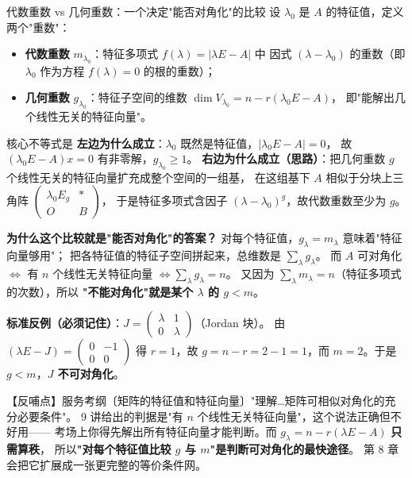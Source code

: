 \begin{fdeep}{代数重数 vs 几何重数：一个决定"能否对角化"的比较}
设 $\lambda_0$ 是 $A$ 的特征值，定义两个"重数"：
\begin{itemize}[leftmargin=2.2em,itemsep=0.22em]
\item \textbf{代数重数} $m_{\lambda_0}$：特征多项式 $f(\lambda)=\lvert\lambda E-A\rvert$ 中
      因式 $(\lambda-\lambda_0)$ 的重数（即 $\lambda_0$ 作为方程 $f(\lambda)=0$ 的根的重数）；
\item \textbf{几何重数} $g_{\lambda_0}$：特征子空间的维数 $\dim V_{\lambda_0}=n-r(\lambda_0 E-A)$，
      即"能解出几个线性无关的特征向量"。
\end{itemize}
核心不等式是
\textbf{左边为什么成立}：$\lambda_0$ 既然是特征值，$\lvert\lambda_0 E-A\rvert=0$，
故 $(\lambda_0 E-A)x=0$ 有非零解，$g_{\lambda_0}\ge1$。
\textbf{右边为什么成立（思路）}：把几何重数 $g$ 个线性无关的特征向量扩充成整个空间的一组基，
在这组基下 $A$ 相似于分块上三角阵 $\begin{pmatrix}\lambda_0 E_g&\ast\\ O&B\end{pmatrix}$，
于是特征多项式含因子 $(\lambda-\lambda_0)^{g}$，故代数重数至少为 $g$。

\medskip
\textbf{为什么这个比较就是"能否对角化"的答案？}
对每个特征值，$g_{\lambda}=m_{\lambda}$ 意味着"特征向量够用"；
把各特征值的特征子空间拼起来，总维数是 $\sum_{\lambda}g_{\lambda}$。
而 $A$ 可对角化 $\iff$ 有 $n$ 个线性无关特征向量 $\iff\sum_{\lambda}g_{\lambda}=n$。
又因为 $\sum_{\lambda}m_{\lambda}=n$（特征多项式的次数），所以
\textbf{"不能对角化"就是某个 $\lambda$ 的 $g<m$}。

\textbf{标准反例（必须记住）}：$J=\begin{pmatrix}\lambda&1\\0&\lambda\end{pmatrix}$（Jordan 块）。
由 $(\lambda E-J)=\begin{pmatrix}0&-1\\0&0\end{pmatrix}$ 得 $r=1$，故
$g=n-r=2-1=1$，而 $m=2$。于是 $g<m$，\textbf{$J$ 不可对角化}。

【反哺点】服务考纲〔矩阵的特征值和特征向量〕"理解…矩阵可相似对角化的充分必要条件"。
9 讲给出的判据是"有 $n$ 个线性无关特征向量"，这个说法正确但不好用——
考场上你得先解出所有特征向量才能判断。而 $g_{\lambda}=n-r(\lambda E-A)$ \textbf{只需算秩}，
所以\textbf{"对每个特征值比较 $g$ 与 $m$"是判断可对角化的最快途径}。
第 8 章会把它扩展成一张更完整的等价条件网。
\end{fdeep}

